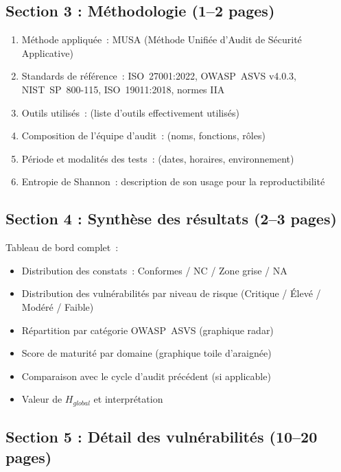 \documentclass[12pt,a4paper,oneside]{report}
\begin{document}
\subsection*{Section 3 : M\'ethodologie (1--2 pages)}

\begin{encadre}
\begin{enumerate}[leftmargin=*, itemsep=4pt]
\item M\'ethode appliqu\'ee~: MUSA (M\'ethode Unifi\'ee d'Audit de S\'ecurit\'e Applicative)
\item Standards de r\'ef\'erence~: ISO~27001:2022, OWASP~ASVS v4.0.3, NIST~SP~800-115, ISO~19011:2018, normes IIA
\item Outils utilis\'es~: (liste d'outils effectivement utilis\'es)
\item Composition de l'\'equipe d'audit~: (noms, fonctions, r\^oles)
\item P\'eriode et modalit\'es des tests~: (dates, horaires, environnement)
\item Entropie de Shannon~: description de son usage pour la reproductibilit\'e
\end{enumerate}
\end{encadre}

\subsection*{Section 4 : Synth\`ese des r\'esultats (2--3 pages)}

\begin{encadre}
Tableau de bord complet~:
\begin{itemize}[label={\color{gold}}, leftmargin=*]
\item Distribution des constats~: Conformes / NC / Zone grise / NA
\item Distribution des vuln\'erabilit\'es par niveau de risque (Critique / \'Elev\'e / Mod\'er\'e / Faible)
\item R\'epartition par cat\'egorie OWASP~ASVS (graphique radar)
\item Score de maturit\'e par domaine (graphique toile d'araign\'ee)
\item Comparaison avec le cycle d'audit pr\'ec\'edent (si applicable)
\item Valeur de $H_{global}$ et interpr\'etation
\end{itemize}
\end{encadre}

\subsection*{Section 5 : D\'etail des vuln\'erabilit\'es (10--20 pages)}
\end{document}

